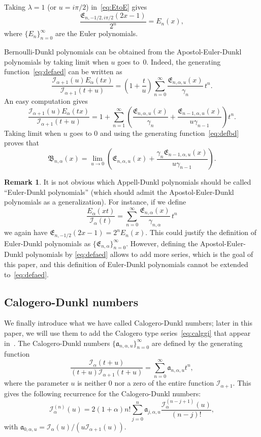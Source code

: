 \documentclass[10pt,a4paper]{article}
\theoremstyle{plain}
\theoremstyle{definition}
\newtheorem{remark}{Remark}
\numberwithin{equation}{section} %
\newcommand{\Ea}{E_{\alpha}}
\newcommand{\I}{\mathcal{I}}
\newcommand{\am}{\mathfrak{a}}
\newcommand{\B}{\mathfrak{B}}
\newcommand{\E}{\mathfrak{E}}
\newcommand{\cc}{\gamma}
\begin{document}
Taking $\lambda=1$ (or $u=i\pi/2$) in~\eqref{eq:EtoE} gives
\[
  \frac{\E_{n,-1/2,i\pi/2}(2x-1)}{2^n} = E_{n}(x),
\]
where $\{E_{n}\}_{n=0}^{\infty}$ are the Euler polynomials.

Bernoulli-Dunkl polynomials can be obtained from the Apostol-Euler-Dunkl polynomials by taking limit when $u$ goes to~$0$. Indeed, the generating function~\eqref{eq:defaed} can be written as
\[
\frac{\I_{\alpha+1}(u)\Ea(tx)}{\I_{\alpha+1}(t+u)}
= \left(1+\frac{t}{u}\right) \sum_{n=0}^\infty \frac{\E_{n,\alpha,u}(x)}{\cc_n} \,t^n.
\]
An easy computation gives
\[
  \frac{\I_{\alpha+1}(u)\Ea(tx)}{\I_{\alpha+1}(t+u)}
  = 1 + \sum_{n=1}^\infty \left(\frac{\E_{n,\alpha,u}(x)}{\cc_n}
  + \frac{\E_{n-1,\alpha,u}(x)}{u\cc_{n-1}}\right)t^n.
\]
Taking limit when $u$ goes to $0$ and using the generating function~\eqref{eq:defbd} proves that
\[
  \B_{n,\alpha}(x) = \lim_{u\to 0} \left(\E_{n,\alpha,u}(x)
  + \frac{\cc_n \E_{n-1,\alpha,u}(x)}{u\cc_{n-1}}\right).
\]

\begin{remark}
It is not obvious which Appell-Dunkl polynomials should be called
``Euler-Dunkl polynomials'' (which should admit the Apostol-Euler-Dunkl
polynomials as a generalization). For instance, if we define
\[
  \frac{\Ea(xt)}{\I_{\alpha}(t)}
  = \sum_{n=0}^\infty \frac{\E_{n,\alpha}(x)}{\cc_{n,\alpha}}\,t^n
\]
we again have $\E_{n,-1/2}(2x-1) = 2^nE_{n}(x)$. This could justify the
definition of Euler-Dunkl polynomials as
$\{\E_{n,\alpha}\}_{n=0}^{\infty}$. However, defining the
Apostol-Euler-Dunkl polynomials by \eqref{eq:defaed} allows to add more series,
which is the goal of this paper, and this definition of Euler-Dunkl
polynomials cannot be extended to~\eqref{eq:defaed}.
\end{remark}

\subsection{Calogero-Dunkl numbers}

We finally introduce what we have called Calogero-Dunkl numbers; later in this paper, we will use them to add the Calogero type series~\eqref{eq:calggi} that appear in~\cite{Cal}. The Calogero-Dunkl numbers $\{\am_{n,\alpha,u}\}_{n=0}^\infty$ are defined by the generating function
\begin{equation}
\label{eq:mamoneon}
  \frac{\I_\alpha(t+u)}{(t+u)\I_{\alpha+1}(t+u)} = \sum_{n=0}^\infty \am_{n,\alpha,u}t^n,
\end{equation}
where the parameter $u$ is neither $0$ nor a zero of the entire function $\I_{\alpha+1}$.
This gives the following recurrence for the Calogero-Dunkl numbers:
\begin{equation}
\label{eq:mamoneon2}
  \I_\alpha^{(n)}(u) = 2(1+\alpha)n! \sum_{j=0}^n \am_{j,\alpha,u} \frac{\I_\alpha^{(n-j+1)}(u)}{(n-j)!},
\end{equation}
with $\am_{0,\alpha,u}=\I_\alpha(u)/(u\I_{\alpha+1}(u))$.
\end{document}
